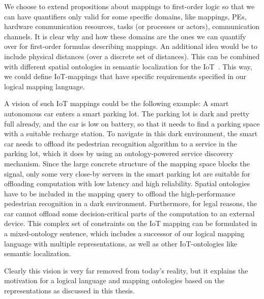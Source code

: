 We choose to extend propositions about mappings to first-order logic so that we can have quantifiers only valid for some specific domains, like mappings, \acp{PE}, hardware communication resources, tasks (or processes or actors), communication channels.
It is clear why and how these domains are the ones we can quantify over for first-order formulas describing mappings.
An additional idea would be to include physical distances (over a discrete set of distances).
This can be combined with different spatial ontologies in semantic localization for the \acf{IoT}~\cite{weber_phdthesis}. 
This way, we could define \ac{IoT}-mappings that have specific requirements specified in our logical mapping  language.

A vision of such \ac{IoT} mappings could be the following example:
A smart autonomous car enters a smart parking lot.
The parking lot is dark and pretty full already, and the car is low on battery, so that it needs to find a parking space with a suitable recharge station.
To navigate in this dark environment, the smart car needs to offload its pedestrian recognition algorithm to a service in the parking lot, which it does by using an ontology-powered service discovery~\cite{weber2019service} mechanism.
Since the large concrete structure of the mapping space blocks the signal, only some very close-by servers in the smart parking lot are suitable for offloading computation with low latency and high reliability.
Spatial ontologies have to be included in the mapping query to offload the high-performance pedestrian recognition in a dark environment.
Furthermore, for legal reasons, the car cannot offload some decision-critical parts of the computation to an external device.
This complex set of constraints on the \ac{IoT} mapping can be formulated in a mixed-ontology sentence, which includes a successor of our logical mapping language with multiple representations, as well as other \ac{IoT}-ontologies like semantic localization.

Clearly this vision is very far removed from today's reality, but it explains the motivation for a logical language and mapping ontologies based on the representations as discussed in this thesis.